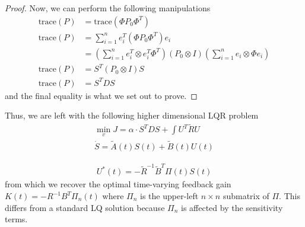 \documentclass[10pt,a4paper]{article}
\begin{document}
\begin{proof}
Now, we can perform the following manipulations 
\begin{align}
\mathrm{trace}(P) &= \mathrm{trace}(\Phi P_0 \Phi^T) \\
\mathrm{trace}(P) &= \sum_{i=1}^{n} e_i^T (\Phi P_0 \Phi^T)e_i \\
&= \left(\sum_{i=1}^{n} e_i^T \otimes e_i^T\Phi^T\right)(P_0\otimes I)\left(\sum_{i=1}^{n} e_i \otimes \Phi e_i\right) \\
\mathrm{trace}(P) &= S^T(P_0\otimes I)S \\ 
\mathrm{trace}(P) &= S^TDS %
\end{align}
and the final equality is what we set out to prove. 
\end{proof}

Thus, we are left with the following higher dimensional LQR problem 
\begin{align}
\min_v J = \alpha\cdot S^TDS + \int U^T\tilde{R}U\\
	\dot{S} = \tilde{A}(t)S(t) + \tilde{B}(t)U(t)
\end{align}

\begin{align}
U^*(t) = -\tilde{R}^{-1}\tilde{B}^T\Pi(t)S(t)
\end{align}
from which we recover the optimal time-varying feedback gain $K(t)=-R^{-1}B^T\Pi_n(t)$ where $\Pi_n$ is the upper-left $n\times n$ submatrix of $\Pi$. This differs from a standard LQ solution because $\Pi_n$ is affected by the sensitivity terms. 
\end{document}
